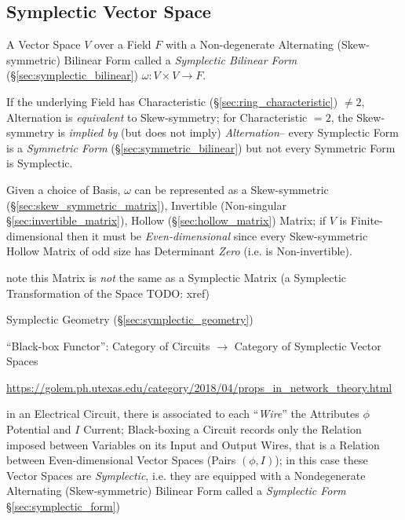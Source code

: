 \subsection{Symplectic Vector Space}\label{sec:symplectic_vectorspace}

A Vector Space $V$ over a Field $F$ with a Non-degenerate Alternating
(Skew-symmetric) Bilinear Form called a \emph{Symplectic Bilinear Form}
(\S\ref{sec:symplectic_bilinear}) $\omega : V \times V \rightarrow F$.

If the underlying Field has Characteristic (\S\ref{sec:ring_characteristic})
$\neq 2$, Alternation is \emph{equivalent} to Skew-symmetry; for Characteristic
$=2$, the Skew-symmetry is \emph{implied by} (but does not imply)
\emph{Alternation}-- every Symplectic Form is a \emph{Symmetric Form}
(\S\ref{sec:symmetric_bilinear}) but not every Symmetric Form is Symplectic.

Given a choice of Basis, $\omega$ can be represented as a Skew-symmetric
(\S\ref{sec:skew_symmetric_matrix}), Invertible (Non-singular
\S\ref{sec:invertible_matrix}), Hollow (\S\ref{sec:hollow_matrix}) Matrix; if
$V$ is Finite-dimensional then it must be \emph{Even-dimensional} since every
Skew-symmetric Hollow Matrix of odd size has Determinant \emph{Zero} (i.e. is
Non-invertible).

note this Matrix is \emph{not} the same as a Symplectic Matrix (a Symplectic
Transformation of the Space TODO: xref)

\fist Symplectic Geometry (\S\ref{sec:symplectic_geometry})

``Black-box Functor'': Category of Circuits $\rightarrow$ Category of
Symplectic Vector Spaces %

\url{https://golem.ph.utexas.edu/category/2018/04/props_in_network_theory.html}

in an Electrical Circuit, there is associated to each ``\emph{Wire}'' the
Attributes $\phi$ Potential and $I$ Current; Black-boxing a Circuit records
only the Relation imposed between Variables on its Input and Output Wires, that
is a Relation between Even-dimensional Vector Spaces (Pairs $(\phi,I)$); in
this case these Vector Spaces are \emph{Symplectic}, i.e. they are equipped
with a Nondegenerate Alternating (Skew-symmetric) Bilinear Form called a
\emph{Symplectic Form} \S\ref{sec:symplectic_form})

